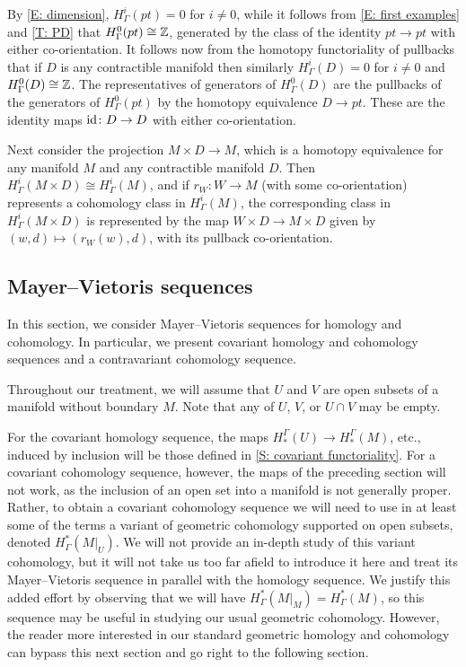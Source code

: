 \begin{example}\label{E: contractible}
By \cref{E: dimension}, $H^i_\Gamma(pt)=0$ for $i\neq 0$, while it follows from \cref{E: first examples} and \cref{T: PD} that  $H^0_\Gamma(pt) \cong \mathbb{Z}$, generated by the class of the identity $pt \to pt$ with either co-orientation.
It follows now from the homotopy functoriality of pullbacks that if $D$ is any contractible manifold then similarly $H^i_\Gamma(D)=0$ for $i\neq 0$ and $H^0_\Gamma(D) \cong \mathbb{Z}$. The representatives of generators of $H^0_\Gamma(D)$ are the pullbacks of the generators of $H^0_\Gamma(pt)$ by the homotopy equivalence $D \to pt$. These are the identity maps $\mathrm{id} \colon D \to D$ with either co-orientation.

Next consider the projection $M \times D \to M$, which is a homotopy equivalence for any manifold $M$ and any contractible manifold $D$. Then $H^i_\Gamma(M \times D) \cong H^i_\Gamma(M)$, and if $r_W \colon W \to M$ (with some co-orientation) represents a cohomology class in $H^i_\Gamma(M)$, the corresponding class in $H^i_\Gamma(M \times D)$ is represented by the map $W \times D \to M \times D$ given by $(w,d) \mapsto (r_W(w),d)$, with its pullback co-orientation.
\end{example}

\subsection{Mayer--Vietoris sequences}\label{S: MV}

In this section, we consider Mayer--Vietoris sequences for homology and cohomology.
In particular, we present covariant homology and cohomology sequences and a contravariant cohomology sequence.

Throughout our treatment, we will assume that $U$ and $V$ are open subsets of a manifold without boundary $M$.
Note that any of $U$, $V$, or $U \cap V$ may be empty.

For the covariant homology sequence, the maps $H_*^\Gamma(U) \to H_*^\Gamma(M)$, etc., induced by inclusion will be those defined in \cref{S: covariant functoriality}.
For a covariant cohomology sequence, however, the maps of the preceding section will not work, as the inclusion of an open set into a manifold is not generally proper.
Rather, to obtain a covariant cohomology sequence we will need to use in at least some of the terms a variant of geometric cohomology supported on open subsets, denoted $H^*_\Gamma(M|_U)$.
We will not provide an in-depth study of this variant cohomology, but it will not take us too far afield to introduce it here and treat its Mayer--Vietoris sequence in parallel with the homology sequence.
We justify this added effort by observing that we will have $H^*_\Gamma(M|_M) = H^*_\Gamma(M)$, so this sequence may be useful in studying our usual geometric cohomology.
However, the reader more interested in our standard geometric homology and cohomology can bypass this next section and go right to the following section.


